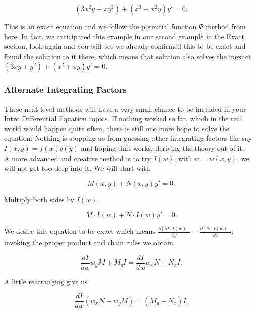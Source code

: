 \documentclass[12pt]{article}
\begin{document}
\begin{equation*}
    (3x^2y+xy^2) + (x^3+x^2y)y'=0.
\end{equation*}

This is an exact equation and we follow the potential function $\Psi$ method from here. In fact, we anticipated this example in our second example in the Exact section, look again and you will see we already confirmed this to be exact and found the solution to it there, which means that solution also solves the inexact $(3xy+y^2) + (x^2+xy)y'=0$.

\subsubsection{Alternate Integrating Factors}

These next level methods will have a very small chance to be included in your Intro Differential Equation topics. If nothing worked so far, which in the real world would happen quite often, there is still one more hope to solve the equation. Nothing is stopping us from guessing other integrating factors like say $I(x,y)=f(x)g(y)$ and hoping that works, deriving the theory out of it. \\

A more advanced and creative method is to try $I(w)$, with $w=w(x,y)$, we will not get too deep into it. We will start with

\begin{equation*}
    M(x,y)+N(x,y)y'=0.
\end{equation*}

Multiply both sides by $I(w)$,

\begin{equation*}
    M\cdot I(w)+N\cdot I(w)y'=0.
\end{equation*}

We desire this equation to be exact which means $\frac{\partial [M\cdot I(w)]}{\partial y}=\frac{\partial [N\cdot I(w)]}{\partial x}$, invoking the proper product and chain rules we obtain

\begin{equation*}
    \frac{dI}{dw} w_y M + M_y I=\frac{dI}{dw} w_x N + N_x I.
\end{equation*}

A little rearranging give us

\begin{equation*}
    \frac{dI}{dw} (w_x N - w_y M) = (M_y - N_x) I.
\end{equation*}
\end{document}
